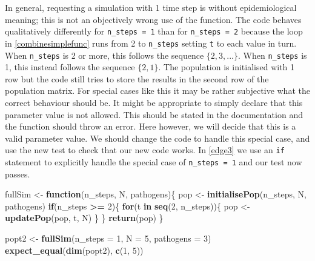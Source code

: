 \documentclass[
]{article}
\newenvironment{Shaded}{\begin{snugshade}}{\end{snugshade}}
\newcommand{\ControlFlowTok}[1]{\textcolor[rgb]{0.13,0.29,0.53}{\textbf{#1}}}
\newcommand{\DataTypeTok}[1]{\textcolor[rgb]{0.13,0.29,0.53}{#1}}
\newcommand{\DecValTok}[1]{\textcolor[rgb]{0.00,0.00,0.81}{#1}}
\newcommand{\KeywordTok}[1]{\textcolor[rgb]{0.13,0.29,0.53}{\textbf{#1}}}
\newcommand{\NormalTok}[1]{#1}
\newcommand{\OperatorTok}[1]{\textcolor[rgb]{0.81,0.36,0.00}{\textbf{#1}}}
\newcommand{\StringTok}[1]{\textcolor[rgb]{0.31,0.60,0.02}{#1}}
\begin{document}
In general, requesting a simulation with 1 time step is without epidemiological meaning; this is not an objectively wrong use of the function.
The code behaves qualitatively differently for \texttt{n\_steps\ =\ 1} than for \texttt{n\_steps\ =\ 2} because the loop in \ref{combinesimplefunc} runs from 2 to \texttt{n\_steps} setting \texttt{t} to each value in turn.
When \texttt{n\_steps} is 2 or more, this follows the sequence \(\{2, 3, ...\}\).
When \texttt{n\_steps} is 1, this instead follows the sequence \(\{2, 1\}\).
The population is initialised with 1 row but the code still tries to store the results in the second row of the population matrix.
For special cases like this it may be rather subjective what the correct behaviour should be.
It might be appropriate to simply declare that this parameter value is not allowed.
This should be stated in the documentation and the function should throw an error.
Here however, we will decide that this is a valid parameter value.
We should change the code to handle this special case, and use the new test to check that our new code works.
In \ref{edge3} we use an \texttt{if} statement to explicitly handle the special case of \texttt{n\_steps\ =\ 1} and our test now passes.
\newline
{}\label{edge3}

\begin{Shaded}
\begin{Highlighting}[]
\NormalTok{fullSim <-}\StringTok{ }\ControlFlowTok{function}\NormalTok{(n_steps, N, pathogens)\{}
\NormalTok{  pop <-}\StringTok{ }\KeywordTok{initialisePop}\NormalTok{(n_steps, N, pathogens) }
  \ControlFlowTok{if}\NormalTok{(n_steps }\OperatorTok{>=}\StringTok{ }\DecValTok{2}\NormalTok{)\{}
    \ControlFlowTok{for}\NormalTok{(t }\ControlFlowTok{in} \KeywordTok{seq}\NormalTok{(}\DecValTok{2}\NormalTok{, n_steps))\{}
\NormalTok{      pop <-}\StringTok{ }\KeywordTok{updatePop}\NormalTok{(pop, t, N)}
\NormalTok{    \}}
\NormalTok{  \}}
  \KeywordTok{return}\NormalTok{(pop)}
\NormalTok{\}}

\NormalTok{popt2 <-}\StringTok{ }\KeywordTok{fullSim}\NormalTok{(}\DataTypeTok{n_steps =} \DecValTok{1}\NormalTok{, }\DataTypeTok{N =} \DecValTok{5}\NormalTok{, }\DataTypeTok{pathogens =} \DecValTok{3}\NormalTok{)}
\KeywordTok{expect_equal}\NormalTok{(}\KeywordTok{dim}\NormalTok{(popt2), }\KeywordTok{c}\NormalTok{(}\DecValTok{1}\NormalTok{, }\DecValTok{5}\NormalTok{))}
\end{Highlighting}
\end{Shaded}
\end{document}
